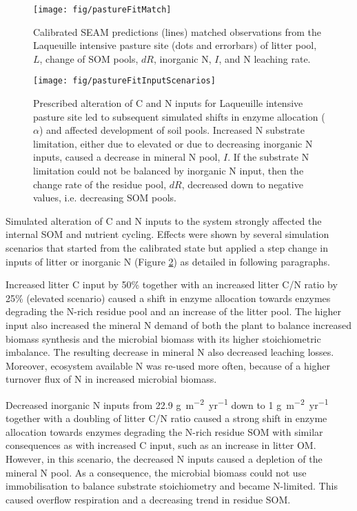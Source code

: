 \begin{figure}[t] \vspace*{2mm}
\begin{center}
\texttt{[image: fig/pastureFitMatch]} 
\end{center}
\caption{
Calibrated SEAM predictions (lines)  matched observations from the
Laqueuille intensive pasture site (dots and errorbars) of litter pool, $L$, change of
SOM pools, $dR$, inorganic N, $I$, and N leaching rate.
\label{fig:pastureFitMatch}}
\end{figure}

\begin{figure}[t] \vspace*{2mm}
\begin{center}
\texttt{[image: fig/pastureFitInputScenarios]} 
\end{center}
\caption{
Prescribed alteration of C and N inputs for Laqueuille intensive pasture site
led to subsequent simulated shifts in enzyme allocation ($\alpha$) and affected
development of soil pools.
Increased N substrate limitation, either due to elevated  or due to
decreasing inorganic N inputs, caused a decrease in mineral N pool, $I$. If the
substrate N limitation could not be balanced by inorganic N input, then the
change rate of the residue pool, $dR$, decreased down to negative values, i.e.
decreasing SOM pools.
\label{fig:pastureFitScen}}  
\end{figure}   
   
Simulated alteration of C and N inputs to the system strongly affected the
internal SOM and nutrient cycling. Effects were shown by several
simulation scenarios that started from the calibrated state but applied a step change in
inputs of litter or inorganic N (Figure \ref{fig:pastureFitScen}) as detailed
in following paragraphs.

Increased litter C input by 50\% together with an increased litter C/N ratio by
25\% (elevated  scenario) caused a shift in enzyme allocation towards
enzymes degrading the N-rich residue pool and an increase of the litter pool.
The higher input also increased the mineral N demand of both the plant to
balance increased biomass synthesis and the microbial biomass with its higher
stoichiometric imbalance. The resulting decrease in mineral N also decreased
leaching losses. Moreover, ecosystem available N was re-used more often, because
of a higher turnover flux of N in increased microbial biomass.

Decreased inorganic N inputs from 22.9
\unit{g~m^{-2}yr^{-1}} down to 1
\unit{g~m^{-2}yr^{-1}} together with a doubling of litter C/N
ratio caused a strong shift in enzyme allocation towards enzymes degrading the
N-rich residue SOM with similar consequences as with increased C input,
such as an increase in litter OM. However, in this scenario, the decreased N inputs caused
a depletion of the mineral N pool.
As a consequence, the microbial biomass could not use immobilisation to
balance substrate stoichiometry and became N-limited.
This caused overflow respiration and a decreasing trend in residue SOM. 

